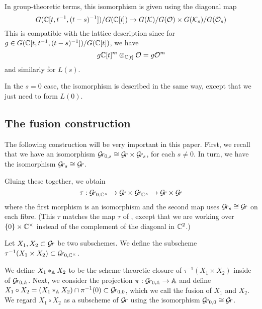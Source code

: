 \documentclass[draft]{article}
\begin{document}
\begin{enumerate}
    In group-theoretic terms, this isomorphism is given using the diagonal map
    $$G(\CC[t, t^{-1}, (t-s)^{-1}])/G(\CC[t]) \rightarrow G(\cK)/G(\cO) \times G(\cK_s)/G(\cO_s)
    $$
    This is compatible with the lattice description since for $ g \in G(\CC[t, t^{-1}, (t-s)^{-1}])/G(\CC[t]) $, we have
    $$
    g \CC[t]^m \otimes_{\CC[t]} \cO = g \cO^m
    $$
    and similarly for $ L(s)$.
    
    In the $ s = 0 $ case, the isomorphism is described in the same way, except that we just need to form $ L(0)$.
    
    
\end{enumerate}

\subsection{The fusion construction}
The following construction will be very important in this paper.
First, we recall that we have an isomorphism $ \Gr_{0,s} \cong \Gr \times \Gr_s $, 
for each $ s \ne 0$.  In turn, we have the isomorphism $ \Gr_s \cong \Gr$.  

Gluing these together, we obtain
$$
\tau : \Gr_{0, \CC^\times} \rightarrow \Gr \times \Gr_{\CC^\times} \rightarrow \Gr \times \Gr
$$
where the first morphism is an isomorphism and the second map uses $ \Gr_s \cong \Gr $ on each fibre.  (This $\tau$ matches the map $ \tau $ of \cite{mirkovicvilonen}, except that we are working over $ \{0 \} \times \CC^\times$ instead of the complement of the diagonal in $ \CC^2 $.)

Let $ X_1, X_2 \subset \Gr$ be two subschemes.
We define the subscheme $ \tau^{-1}(X_1 \times X_2) \subset \Gr_{0, \CC^\times} $.


We define $ X_1 \ast_{\AA} X_2 $ to be the scheme-theoretic closure of $  \tau^{-1}(X_1 \times X_2) $ inside of $ \Grbd $.  
Next, we consider the projection $ \pi: \Grbd \rightarrow \AA $ and define $ X_1 \circ X_2 = (X_1 \ast_\AA X_2) \cap \pi^{-1}(0) \subset \Gr_{0,0} $, which we call the fusion of $ X_1 $ and $X_2$.  
We regard $ X_1 \circ X_2$ as a subscheme of $ \Gr $ using {the isomorphism} $\Gr_{0,0} \cong \Gr $. 
\end{document}
